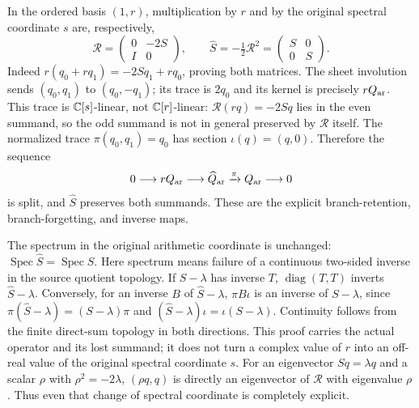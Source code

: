 In the ordered basis $(1,r)$, multiplication by $r$ and by the
original spectral coordinate $s$ are, respectively,
\begin{equation}
 \mathcal R=\begin{pmatrix}0&-2S\\I&0\end{pmatrix},
 \qquad \widehat S=-\tfrac12\mathcal R^2
          =\begin{pmatrix}S&0\\0&S\end{pmatrix}.
 \label{eq:retained-arithmetic-matrices}
\end{equation}
Indeed $r(q_0+r q_1)=-2S q_1+r q_0$, proving both matrices.
The sheet involution sends $(q_0,q_1)$ to $(q_0,-q_1)$;
its trace is $2q_0$ and its kernel is precisely $rQ_{\rm ar}$.
This trace is $\mathbb C[s]$-linear, not $\mathbb C[r]$-linear:
$\mathcal R(rq)=-2Sq$ lies in the even summand, so the odd
summand is not in general preserved by $\mathcal R$ itself.
The normalized trace $\pi(q_0,q_1)=q_0$ has section
$\iota(q)=(q,0)$. Therefore the sequence
\[
 0\longrightarrow rQ_{\rm ar}\longrightarrow\widehat Q_{\rm ar}
 \xrightarrow{\pi}Q_{\rm ar}\longrightarrow0
\]
is split, and $\widehat S$ preserves both summands. These are the
explicit branch-retention, branch-forgetting, and inverse maps.

The spectrum in the original arithmetic coordinate is unchanged:
$\operatorname{Spec}\widehat S=\operatorname{Spec}S$.
Here spectrum means failure of a continuous two-sided inverse in
the source quotient topology. If $S-\lambda$ has inverse $T$,
$\operatorname{diag}(T,T)$ inverts $\widehat S-\lambda$.
Conversely, for an inverse $B$ of $\widehat S-\lambda$,
$\pi B\iota$ is an inverse of $S-\lambda$, since
$\pi(\widehat S-\lambda)=(S-\lambda)\pi$ and
$(\widehat S-\lambda)\iota=\iota(S-\lambda)$.
Continuity follows from the finite direct-sum topology in both
directions. This proof carries the actual operator and its lost
summand; it does not turn a complex value of $r$ into an off-real
value of the original spectral coordinate $s$.
For an eigenvector $Sq=\lambda q$ and a scalar $\rho$ with
$\rho^2=-2\lambda$, $(\rho q,q)$ is directly an eigenvector of
$\mathcal R$ with eigenvalue $\rho$.
Thus even that change of spectral coordinate is completely explicit.


